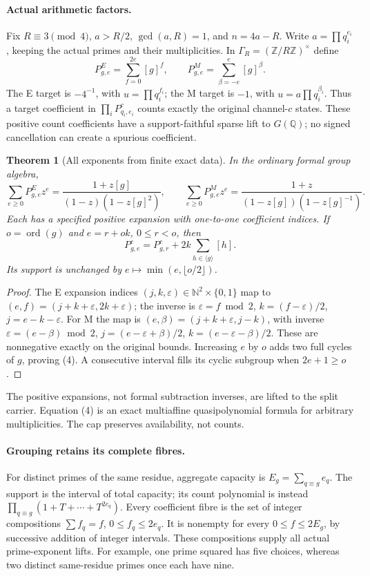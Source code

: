 \documentclass[10pt,a4paper]{article}
\newtheorem{theorem}{Theorem}
\begin{document}
\paragraph{Actual arithmetic factors.}
Fix $R\equiv3\pmod4$, $a>R/2$, $\gcd(a,R)=1$, and $n=4a-R$.
Write $a=\prod q_i^{e_i}$, keeping the actual primes and their multiplicities.
In $\Gamma_R=(\mathbb Z/R\mathbb Z)^\times$ define
\[
 P^E_{g,e}=\sum_{f=0}^{2e}[g]^f,\qquad
 P^M_{g,e}=\sum_{\beta=-e}^{e}[g]^\beta.
 \tag{2}
\]
The E target is $-4^{-1}$, with $u=\prod q_i^{f_i}$; the M target is $-1$,
with $u=a\prod q_i^{\beta_i}$. Thus a target coefficient in
$\prod_iP^c_{q_i,e_i}$ counts exactly the original channel-$c$ states.
These positive count coefficients have a support-faithful sparse lift to
$G(\mathbb Q)$; no signed cancellation can create a spurious coefficient.

\begin{theorem}[All exponents from finite exact data]
In the ordinary formal group algebra,
\[
 \sum_{e\ge0}P^E_{g,e}z^e=\frac{1+z[g]}{(1-z)(1-z[g]^2)},\qquad
 \sum_{e\ge0}P^M_{g,e}z^e=\frac{1+z}{(1-z[g])(1-z[g]^{-1})}.
 \tag{3}
\]
Each has a specified positive expansion with one-to-one coefficient indices.
If $o=\operatorname{ord}(g)$ and $e=r+ok$, $0\le r<o$, then
\[
 P^c_{g,e}=P^c_{g,r}+2k\sum_{h\in\langle g\rangle}[h].
 \tag{4}
\]
Its support is unchanged by $e\mapsto\min(e,\lfloor o/2\rfloor)$.
\end{theorem}
\begin{proof}
The E expansion indices $(j,k,\varepsilon)\in\mathbb N^2\times\{0,1\}$
map to $(e,f)=(j+k+\varepsilon,2k+\varepsilon)$; the inverse is
$\varepsilon=f\bmod2$, $k=(f-\varepsilon)/2$, $j=e-k-\varepsilon$.
For M the map is $(e,\beta)=(j+k+\varepsilon,j-k)$, with inverse
$\varepsilon=(e-\beta)\bmod2$, $j=(e-\varepsilon+\beta)/2$,
$k=(e-\varepsilon-\beta)/2$. These are nonnegative exactly on the original
bounds. Increasing $e$ by $o$ adds two full cycles of $g$, proving (4).
A consecutive interval fills its cyclic subgroup when $2e+1\ge o$.
\end{proof}
The positive expansions, not formal subtraction inverses, are lifted to the
split carrier. Equation (4) is an exact multiaffine quasipolynomial formula
for arbitrary multiplicities. The cap preserves availability, not counts.

\paragraph{Grouping retains its complete fibres.}
For distinct primes of the same residue, aggregate capacity is
$E_g=\sum_{q\equiv g}e_q$. The support is the interval of total capacity;
its count polynomial is instead $\prod_{q\equiv g}(1+T+\cdots+T^{2e_q})$.
Every coefficient fibre is the set of integer compositions
$\sum f_q=f$, $0\le f_q\le2e_q$. It is nonempty for every $0\le f\le2E_g$,
by successive addition of integer intervals. These compositions supply all
actual prime-exponent lifts. For example, one prime squared has five choices,
whereas two distinct same-residue primes once each have nine.
\end{document}
